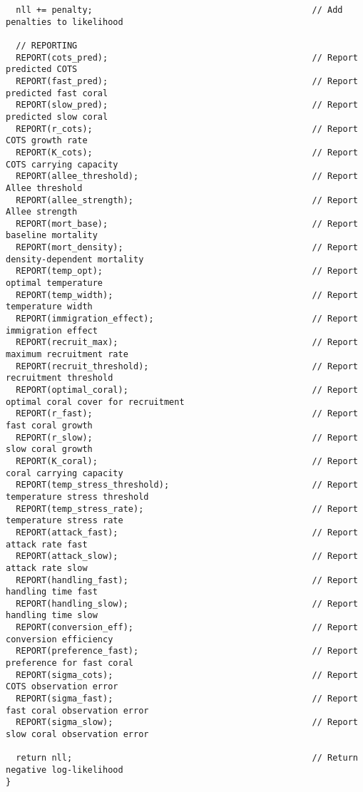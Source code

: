 \begin{lstlisting}
  nll += penalty;                                           // Add penalties to likelihood
  
  // REPORTING
  REPORT(cots_pred);                                        // Report predicted COTS
  REPORT(fast_pred);                                        // Report predicted fast coral
  REPORT(slow_pred);                                        // Report predicted slow coral
  REPORT(r_cots);                                           // Report COTS growth rate
  REPORT(K_cots);                                           // Report COTS carrying capacity
  REPORT(allee_threshold);                                  // Report Allee threshold
  REPORT(allee_strength);                                   // Report Allee strength
  REPORT(mort_base);                                        // Report baseline mortality
  REPORT(mort_density);                                     // Report density-dependent mortality
  REPORT(temp_opt);                                         // Report optimal temperature
  REPORT(temp_width);                                       // Report temperature width
  REPORT(immigration_effect);                               // Report immigration effect
  REPORT(recruit_max);                                      // Report maximum recruitment rate
  REPORT(recruit_threshold);                                // Report recruitment threshold
  REPORT(optimal_coral);                                    // Report optimal coral cover for recruitment
  REPORT(r_fast);                                           // Report fast coral growth
  REPORT(r_slow);                                           // Report slow coral growth
  REPORT(K_coral);                                          // Report coral carrying capacity
  REPORT(temp_stress_threshold);                            // Report temperature stress threshold
  REPORT(temp_stress_rate);                                 // Report temperature stress rate
  REPORT(attack_fast);                                      // Report attack rate fast
  REPORT(attack_slow);                                      // Report attack rate slow
  REPORT(handling_fast);                                    // Report handling time fast
  REPORT(handling_slow);                                    // Report handling time slow
  REPORT(conversion_eff);                                   // Report conversion efficiency
  REPORT(preference_fast);                                  // Report preference for fast coral
  REPORT(sigma_cots);                                       // Report COTS observation error
  REPORT(sigma_fast);                                       // Report fast coral observation error
  REPORT(sigma_slow);                                       // Report slow coral observation error
  
  return nll;                                               // Return negative log-likelihood
}
\end{lstlisting}

